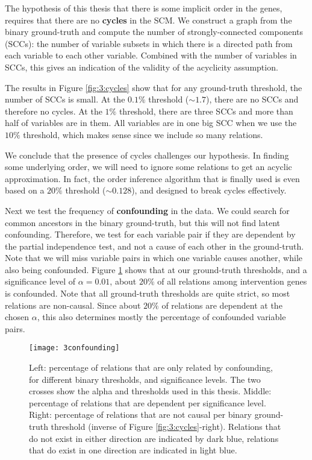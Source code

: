 The hypothesis of this thesis that there is some implicit order in the genes, requires that there are no \textbf{cycles} in the SCM. We construct a graph from the binary ground-truth and compute the number of strongly-connected components (SCCs): the number of variable subsets in which there is a directed path from each variable to each other variable. Combined with the number of variables in SCCs, this gives an indication of the validity of the acyclicity assumption. 

The results in Figure \ref{fig:3:cycles} show that for any ground-truth threshold, the number of SCCs is small. At the $0.1\%$ threshold ($\sim 1.7$), there are no SCCs and therefore no cycles. At the $1\%$ threshold, there are three SCCs and more than half of variables are in them. All variables are in one big SCC when we use the $10\%$ threshold, which makes sense since we include so many relations. 

We conclude that the presence of cycles challenges our hypothesis. In finding some underlying order, we will need to ignore some relations to get an acyclic approximation. In fact, the order inference algorithm that is finally used is even based on a $20\%$ threshold ($\sim 0.128$), and designed to break cycles effectively. 

Next we test the frequency of \textbf{confounding} in the data. We could search for common ancestors in the binary ground-truth, but this will not find latent confounding. Therefore, we test for each variable pair if they are dependent by the partial independence test, and not a cause of each other in the ground-truth. Note that we will miss variable pairs in which one variable causes another, while also being confounded. Figure \ref{fig:3:confounding} shows that at our ground-truth thresholds, and a significance level of $\alpha = 0.01$, about $20\%$ of all relations among intervention genes is confounded. Note that all ground-truth thresholds are quite strict, so most relations are non-causal. Since about $20\%$ of relations are dependent at the chosen $\alpha$, this also determines mostly the percentage of confounded variable pairs.

\begin{figure}[h]
    \centering
    \texttt{[image: 3confounding]}
    \caption{Left: percentage of relations that are only related by confounding, for different binary thresholds, and significance levels. The two crosses show the alpha and thresholds used in this thesis. Middle: percentage of relations that are dependent per significance level. Right: percentage of relations that are not causal per binary ground-truth threshold (inverse of Figure \ref{fig:3:cycles}-right). Relations that do not exist in either direction are indicated by dark blue, relations that do exist in one direction are indicated in light blue.}
    \label{fig:3:confounding}
\end{figure}    

